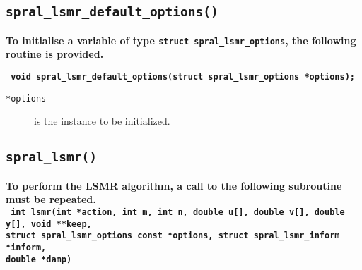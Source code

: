 \subsection{\texttt{spral\_lsmr\_default\_options()}}
\textbf{To initialise a variable of type \texttt{struct spral\_lsmr\_options},
the following routine is provided.}

\vspace*{0.1cm}
\noindent
\textbf{\texttt{
   \hspace*{0.3cm} void spral\_lsmr\_default\_options(struct spral\_lsmr\_options *options);
}}

\noindent
\begin{description}
   \item[\texttt{*options}] is the instance to be initialized.
\end{description}

\subsection{\texttt{spral\_lsmr()}}
\textbf{
   To perform the LSMR algorithm, a call to the following subroutine must be
   repeated.
   \vspace{0.2cm}\\
   \texttt{
      \hspace*{0.2cm} int lsmr(int *action, int m, int n, double u[], double v[], double y[], void **keep,\\
      \hspace*{0.7cm} struct spral\_lsmr\_options const *options, struct spral\_lsmr\_inform *inform,\\
      \hspace*{0.7cm} double *damp)
   }
}

